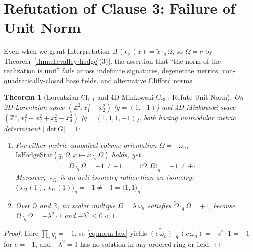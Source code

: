 \documentclass[11pt]{article}
\newtheorem{theorem}{Theorem}[section]
\theoremstyle{definition}
\newcommand{\Cl}{\mathrm{Cl}}
\begin{document}
\section{Refutation of Clause 3: Failure of Unit Norm}

Even when we grant Interpretation~B ($\star_\nu(x) = \widetilde{x}\cdot_q \Omega$, so $\Omega = \nu$ by Theorem~\ref{thm:chevalley-hodge}(3)), the assertion that ``the norm of the realization is unit'' fails across indefinite signatures, degenerate metrics, non-quadratically-closed base fields, and alternative Clifford norms.

\begin{theorem}[Lorentzian $\Cl_{1,1}$ and 4D Minkowski $\Cl_{3,1}$ Refute Unit Norm]\label{thm:lorentz}
On 2D Lorentzian space $(\mathbb{Z}^2, x_1^2 - x_2^2)$ ($q = (1,-1)$) and 4D Minkowski space $(\mathbb{Z}^4, x_1^2 + x_2^2 + x_3^2 - x_4^2)$ ($q = (1,1,1,-1)$), both having unimodular metric determinant $|\det G| = 1$:
\begin{enumerate}
  \item[(1)] For either metric-canonical volume orientation $\Omega = \pm\omega_n$, $\mathrm{IsHodgeStar}(q, \Omega, x \mapsto \widetilde{x}\cdot_q\Omega)$ holds, yet
  \[
    \widetilde{\Omega}\cdot_q \Omega = -1 \neq +1, \qquad \langle \Omega, \Omega \rangle_q = -1 \neq +1.
  \]
  Moreover, $\star_\Omega$ is an anti-isometry rather than an isometry: $\langle \star_\Omega(1), \star_\Omega(1) \rangle_q = -1 \neq +1 = \langle 1, 1 \rangle_q$.
  \item[(2)] Over $\mathbb{Q}$ and $\mathbb{R}$, \emph{no} scalar multiple $\Omega = \lambda\,\omega_n$ satisfies $\widetilde{\Omega}\cdot_q \Omega = +1$, because $\widetilde{\Omega}\cdot_q \Omega = -\lambda^2\cdot 1$ and $-\lambda^2 \le 0 < 1$.
\end{enumerate}
\end{theorem}
\begin{proof}
Here $\prod_i q_i = -1$, so \eqref{eq:norm-law} yields $\widetilde{(c\,\omega_n)}\cdot_q(c\,\omega_n) = -c^2\cdot 1 = -1$ for $c = \pm 1$, and $-\lambda^2 = 1$ has no solution in any ordered ring or field.
\end{proof}
\end{document}
